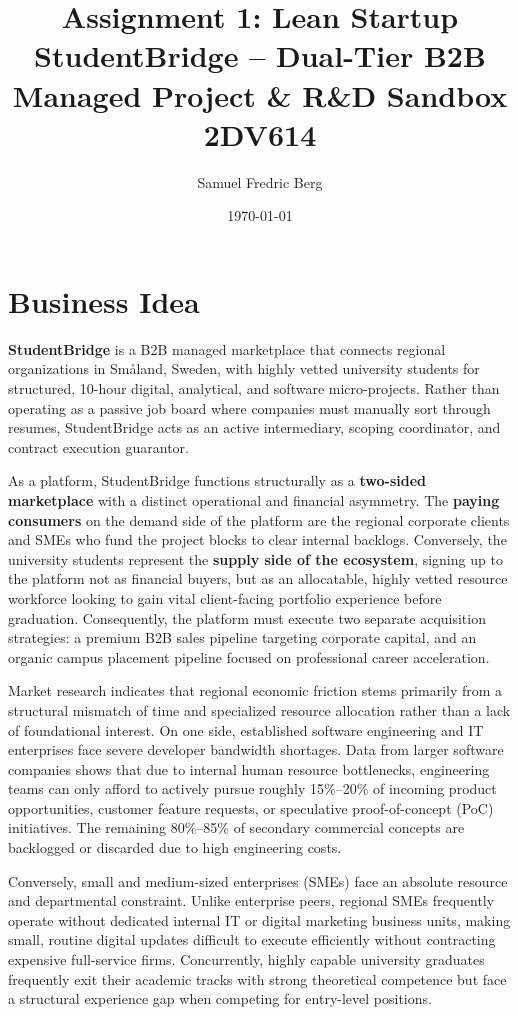 \documentclass[12pt,a4paper]{article}
\title{\textbf{Assignment 1: Lean Startup}\\
       \large StudentBridge -- Dual-Tier B2B Managed Project \& R\&D Sandbox\\[0.5em]
       \normalsize 2DV614}
\author{Samuel Fredric Berg}
\date{\today}
\begin{document}
\maketitle
\thispagestyle{empty}
\newpage
\tableofcontents
\newpage

\section{Business Idea}

\textbf{StudentBridge} is a B2B managed marketplace that connects regional organizations in Småland, Sweden, with highly vetted university students for structured, 10-hour digital, analytical, and software micro-projects. Rather than operating as a passive job board where companies must manually sort through resumes, StudentBridge acts as an active intermediary, scoping coordinator, and contract execution guarantor.

As a platform, StudentBridge functions structurally as a \textbf{two-sided marketplace} with a distinct operational and financial asymmetry. The \textbf{paying consumers} on the demand side of the platform are the regional corporate clients and SMEs who fund the project blocks to clear internal backlogs. Conversely, the university students represent the \textbf{supply side of the ecosystem}, signing up to the platform not as financial buyers, but as an allocatable, highly vetted resource workforce looking to gain vital client-facing portfolio experience before graduation. Consequently, the platform must execute two separate acquisition strategies: a premium B2B sales pipeline targeting corporate capital, and an organic campus placement pipeline focused on professional career acceleration.

Market research indicates that regional economic friction stems primarily from a structural mismatch of time and specialized resource allocation rather than a lack of foundational interest. On one side, established software engineering and IT enterprises face severe developer bandwidth shortages. Data from larger software companies shows that due to internal human resource bottlenecks, engineering teams can only afford to actively pursue roughly 15\%--20\% of incoming product opportunities, customer feature requests, or speculative proof-of-concept (PoC) initiatives. The remaining 80\%--85\% of secondary commercial concepts are backlogged or discarded due to high engineering costs.

Conversely, small and medium-sized enterprises (SMEs) face an absolute resource and departmental constraint. Unlike enterprise peers, regional SMEs frequently operate without dedicated internal IT or digital marketing business units, making small, routine digital updates difficult to execute efficiently without contracting expensive full-service firms. Concurrently, highly capable university graduates frequently exit their academic tracks with strong theoretical competence but face a structural experience gap when competing for entry-level positions.
\end{document}
